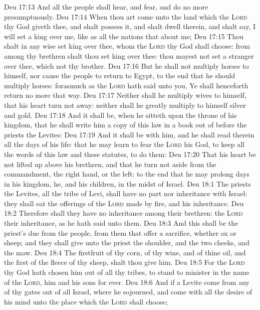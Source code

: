\vs Deu 17:13 And all the people shall hear, and fear, and do no more presumptuously.
\vs Deu 17:14 When thou art come unto the land which the \textsc{Lord} thy God giveth thee, and shalt possess it, and shalt dwell therein, and shalt say, I will set a king over me, like as all the nations that  about me;
\vs Deu 17:15 Thou shalt in any wise set  king over thee, whom the \textsc{Lord} thy God shall choose:  from among thy brethren shalt thou set king over thee: thou mayest not set a stranger over thee, which  not thy brother.
\vs Deu 17:16 But he shall not multiply horses to himself, nor cause the people to return to Egypt, to the end that he should multiply horses: forasmuch as the \textsc{Lord} hath said unto you, Ye shall henceforth return no more that way.
\vs Deu 17:17 Neither shall he multiply wives to himself, that his heart turn not away: neither shall he greatly multiply to himself silver and gold.
\vs Deu 17:18 And it shall be, when he sitteth upon the throne of his kingdom, that he shall write him a copy of this law in a book out of  before the priests the Levites:
\vs Deu 17:19 And it shall be with him, and he shall read therein all the days of his life: that he may learn to fear the \textsc{Lord} his God, to keep all the words of this law and these statutes, to do them:
\vs Deu 17:20 That his heart be not lifted up above his brethren, and that he turn not aside from the commandment,  the right hand, or  the left: to the end that he may prolong  days in his kingdom, he, and his children, in the midst of Israel.
\vs Deu 18:1 The priests the Levites,  all the tribe of Levi, shall have no part nor inheritance with Israel: they shall eat the offerings of the \textsc{Lord} made by fire, and his inheritance.
\vs Deu 18:2 Therefore shall they have no inheritance among their brethren: the \textsc{Lord}  their inheritance, as he hath said unto them.
\vs Deu 18:3 And this shall be the priest's due from the people, from them that offer a sacrifice, whether  ox or sheep; and they shall give unto the priest the shoulder, and the two cheeks, and the maw.
\vs Deu 18:4 The firstfruit  of thy corn, of thy wine, and of thine oil, and the first of the fleece of thy sheep, shalt thou give him.
\vs Deu 18:5 For the \textsc{Lord} thy God hath chosen him out of all thy tribes, to stand to minister in the name of the \textsc{Lord}, him and his sons for ever.
\vs Deu 18:6 And if a Levite come from any of thy gates out of all Israel, where he sojourned, and come with all the desire of his mind unto the place which the \textsc{Lord} shall choose;
